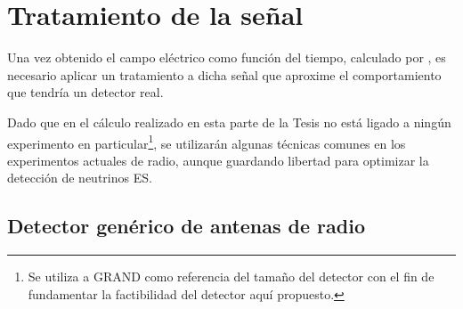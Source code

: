 \section{Tratamiento de la se\~nal}
\label{sbsc:sig_treat}
	
	Una vez obtenido el campo el\'ectrico como funci\'on del tiempo, calculado por \zhs{}, es necesario aplicar un tratamiento a dicha se\~nal que aproxime el comportamiento que tendr\'ia un detector real.
	
	Dado que en el c\'alculo realizado en esta parte de la Tesis no est\'a ligado a ning\'un experimento en particular\footnote{Se utiliza a GRAND como referencia del tama\~no del detector con el fin de fundamentar la factibilidad del detector aqu\'i propuesto.}, se utilizar\'an algunas t\'ecnicas comunes en los experimentos actuales de radio, aunque guardando libertad para optimizar la detecci\'on de neutrinos ES.
	
	
	\subsection{Detector gen\'erico de antenas de radio}
	
